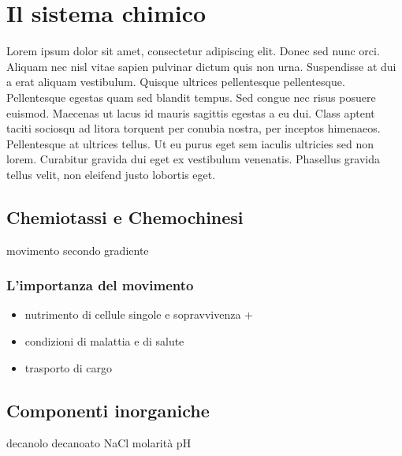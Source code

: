 \chapter{Il sistema chimico}
\vspace{0.5cm}
\label{cha:789}

Lorem ipsum dolor sit amet, consectetur adipiscing elit. Donec sed nunc orci. Aliquam nec nisl vitae sapien pulvinar dictum quis non urna. Suspendisse at dui a erat aliquam vestibulum. Quisque ultrices pellentesque pellentesque. Pellentesque egestas quam sed blandit tempus. Sed congue nec risus posuere euismod. Maecenas ut lacus id mauris sagittis egestas a eu dui. Class aptent taciti sociosqu ad litora torquent per conubia nostra, per inceptos himenaeos. Pellentesque at ultrices tellus. Ut eu purus eget sem iaculis ultricies sed non lorem. Curabitur gravida dui eget ex vestibulum venenatis. Phasellus gravida tellus velit, non eleifend justo lobortis eget. 


\section{Chemiotassi e Chemochinesi}
\label{sec:456}
movimento secondo gradiente 


\subsection{L'importanza del movimento}
\label{sec:00456}
\begin {itemize}
	\item nutrimento di cellule singole e sopravvivenza + 
	\item condizioni di malattia e di salute
	\item trasporto di cargo
\end{itemize}

\section{Componenti inorganiche}
\label{sec:123}
decanolo
decanoato
NaCl  molarità  pH 


